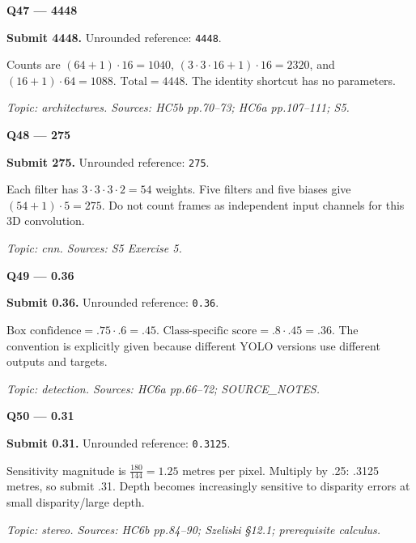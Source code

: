 \documentclass[11pt,a4paper]{article}
\begin{document}
\par\vspace{12pt}
\begin{minipage}{\linewidth}
\textbf{Q47 — 4448}\par\smallskip
\textbf{Submit 4448.} Unrounded reference: \texttt{4448}.\par
Counts are \((64+1)\cdot16=1040\),\allowbreak{} \((3\cdot3\cdot16+1)\cdot16=2320\),\allowbreak{} and \((16+1)\cdot64=1088\). \(\text{Total}=4448\). The identity shortcut has no parameters.\par
{\small\itshape Topic: architectures. Sources: HC5b pp.70–73; HC6a pp.107–111; S5.}

\end{minipage}
\par\vspace{12pt}
\begin{minipage}{\linewidth}
\textbf{Q48 — 275}\par\smallskip
\textbf{Submit 275.} Unrounded reference: \texttt{275}.\par
Each filter has \(3\cdot3\cdot3\cdot2=54\) weights. Five filters and five biases give \((54+1)\cdot5=275\). Do not count frames as independent input channels for this 3D convolution.\par
{\small\itshape Topic: cnn. Sources: S5 Exercise 5.}

\end{minipage}
\par\vspace{12pt}
\begin{minipage}{\linewidth}
\textbf{Q49 — 0.36}\par\smallskip
\textbf{Submit 0.36.} Unrounded reference: \texttt{0.36}.\par
\(\text{Box confidence}=.75\cdot.6=.45\). \(\text{Class-specific score}=.8\cdot.45=.36\). The convention is explicitly given because different YOLO versions use different outputs and targets.\par
{\small\itshape Topic: detection. Sources: HC6a pp.66–72; SOURCE\_\allowbreak{}NOTES.}

\end{minipage}
\par\vspace{12pt}
\begin{minipage}{\linewidth}
\textbf{Q50 — 0.31}\par\smallskip
\textbf{Submit 0.31.} Unrounded reference: \texttt{0.3125}.\par
Sensitivity magnitude is \(\frac{180}{144}=1.25\) metres per pixel. Multiply by .25: .3125 metres,\allowbreak{} so submit .31. Depth becomes increasingly sensitive to disparity errors at small disparity/\allowbreak{}large depth.\par
{\small\itshape Topic: stereo. Sources: HC6b pp.84–90; Szeliski §12.1; prerequisite calculus.}

\end{minipage}
\par\vspace{12pt}
\end{document}

